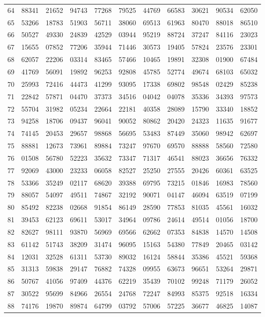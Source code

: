 \begin{table}
\begin{otherlanguage}{english}
\begin{tabular}{|C|CCCCCCCCCC|}
64&88341&21652&94743&77268&79525&44769&66583&30621&90534&62050\\[1ex]
65&53266&18783&51903&56711&38060&69513&61963&80470&88018&86510\\
66&50527&49330&24839&42529&03944&95219&88724&37247&84116&23023\\
67&15655&07852&77206&35944&71446&30573&19405&57824&23576&23301\\
68&62057&22206&03314&83465&57466&10465&19891&32308&01900&67484\\
69&41769&56091&19892&96253&92808&45785&52774&49674&68103&65032\\[1ex]
70&25993&72416&44473&41299&93095&17338&69802&98548&02429&85238\\
71&22842&57871&04470&37373&34516&04042&04078&35336&34393&97573\\
72&55704&31982&05234&22664&22181&40358&28089&15790&33340&18852\\
73&94258&18706&09437&96041&90052&80862&20420&24323&11635&91677\\
74&74145&20453&29657&98868&56695&53483&87449&35060&98942&62697\\[1ex]
75&88881&12673&73961&89884&73247&97670&69570&88888&58560&72580\\
76&01508&56780&52223&35632&73347&71317&46541&88023&36656&76332\\
77&92069&43000&23233&06058&82527&25250&27555&20426&60361&63525\\
78&53366&35249&02117&68620&39388&69795&73215&01846&16983&78560\\
79&88057&54097&49511&74867&32192&90071&04147&46094&63519&07199\\[1ex]
80&85492&82238&02668&91854&86149&28590&77853&81035&45561&16032\\
81&39453&62123&69611&53017&34964&09786&24614&49514&01056&18700\\
82&82627&98111&93870&56969&69566&62662&07353&84838&14570&14508\\
83&61142&51743&38209&31474&96095&15163&54380&77849&20465&03142\\
84&12031&32528&61311&53730&89032&16124&58844&35386&45521&59368\\[1ex]
85&31313&59838&29147&76882&74328&09955&63673&96651&53264&29871\\
86&50767&41056&97409&44376&62219&35439&70102&99248&71179&26052\\
87&30522&95699&84966&26554&24768&72247&84993&85375&92518&16334\\
88&74176&19870&89874&64799&03792&57006&57225&36677&46825&14087\\

\end{tabular}
\end{otherlanguage}
\end{table}
